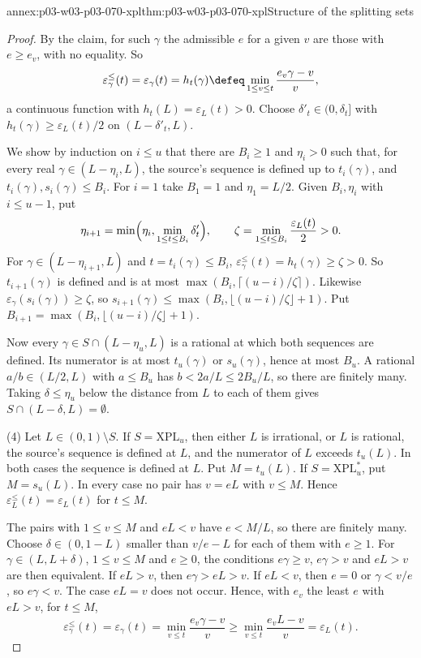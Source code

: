 \begin{annexitem}{annex:p03-w03-p03-070-xpl}{thm:p03-w03-p03-070-xpl}{Structure of the splitting sets}
\begin{proof}
By the claim, for such \(\gamma\) the admissible \(e\) for a given \(v\) are
those with \(e\geq e_v\), with no equality.  So
\[
 \varepsilon^{\leq}_\gamma(t)=\varepsilon_\gamma(t)=h_t(\gamma)\defeq
 \min_{1\leq v\leq t}\frac{e_v\gamma-v}{v} ,
\]
a continuous function with \(h_t(L)=\varepsilon_L(t)>0\).  Choose
\(\delta'_t\in(0,\delta_t]\) with \(h_t(\gamma)\geq\varepsilon_L(t)/2\) on
\((L-\delta'_t,L)\).

We show by induction on \(i\leq u\) that there are \(B_i\geq1\) and
\(\eta_i>0\) such that, for every real \(\gamma\in(L-\eta_i,L)\), the source's
sequence is defined up to \(t_i(\gamma)\), and
\(t_i(\gamma),s_i(\gamma)\leq B_i\).  For \(i=1\) take \(B_1=1\) and
\(\eta_1=L/2\).  Given \(B_i,\eta_i\) with \(i\leq u-1\), put
\[
 \eta_{i+1}=\min\Bigl(\eta_i,\min_{1\leq t\leq B_i}\delta'_t\Bigr),\qquad
 \zeta=\min_{1\leq t\leq B_i}\frac{\varepsilon_L(t)}{2}>0 .
\]
For \(\gamma\in(L-\eta_{i+1},L)\) and \(t=t_i(\gamma)\leq B_i\),
\(\varepsilon^{\leq}_\gamma(t)=h_t(\gamma)\geq\zeta>0\).  So
\(t_{i+1}(\gamma)\) is defined and is at most
\(\max(B_i,\lceil(u-i)/\zeta\rceil)\).  Likewise
\(\varepsilon_\gamma(s_i(\gamma))\geq\zeta\), so
\(s_{i+1}(\gamma)\leq\max(B_i,\lfloor(u-i)/\zeta\rfloor+1)\).  Put
\(B_{i+1}=\max(B_i,\lfloor(u-i)/\zeta\rfloor+1)\).

Now every \(\gamma\in S\cap(L-\eta_u,L)\) is a rational at which both
sequences are defined.  Its numerator is at most \(t_u(\gamma)\) or
\(s_u(\gamma)\), hence at most \(B_u\).  A rational \(a/b\in(L/2,L)\) with
\(a\leq B_u\) has \(b<2a/L\leq2B_u/L\), so there are finitely many.  Taking
\(\delta\leq\eta_u\) below the distance from \(L\) to each of them gives
\(S\cap(L-\delta,L)=\emptyset\).

(4) Let \(L\in(0,1)\setminus S\).  If \(S=\mathrm{XPL}_u\), then either \(L\)
is irrational, or \(L\) is rational, the source's sequence is defined at
\(L\), and the numerator of \(L\) exceeds \(t_u(L)\).  In both cases the
sequence is defined at \(L\).  Put \(M=t_u(L)\).  If
\(S=\mathrm{XPL}^\ast_u\), put \(M=s_u(L)\).  In every case no pair has
\(v=eL\) with \(v\leq M\).  Hence \(\varepsilon^{\leq}_L(t)=\varepsilon_L(t)\)
for \(t\leq M\).

The pairs with \(1\leq v\leq M\) and \(eL<v\) have \(e<M/L\), so there are
finitely many.  Choose \(\delta\in(0,1-L)\) smaller than \(v/e-L\) for each of
them with \(e\geq1\).  For \(\gamma\in(L,L+\delta)\), \(1\leq v\leq M\) and
\(e\geq0\), the conditions \(e\gamma\geq v\), \(e\gamma>v\) and \(eL>v\) are
then equivalent.  If \(eL>v\), then \(e\gamma>eL>v\).  If \(eL<v\), then
\(e=0\) or \(\gamma<v/e\), so \(e\gamma<v\).  The case \(eL=v\) does not
occur.  Hence, with \(e_v\) the least \(e\) with \(eL>v\), for \(t\leq M\),
\[
 \varepsilon^{\leq}_\gamma(t)=\varepsilon_\gamma(t)=\min_{v\leq t}\frac{e_v\gamma-v}{v}
 \geq\min_{v\leq t}\frac{e_vL-v}{v}=\varepsilon_L(t) .
\]


\end{proof}
\end{annexitem}
